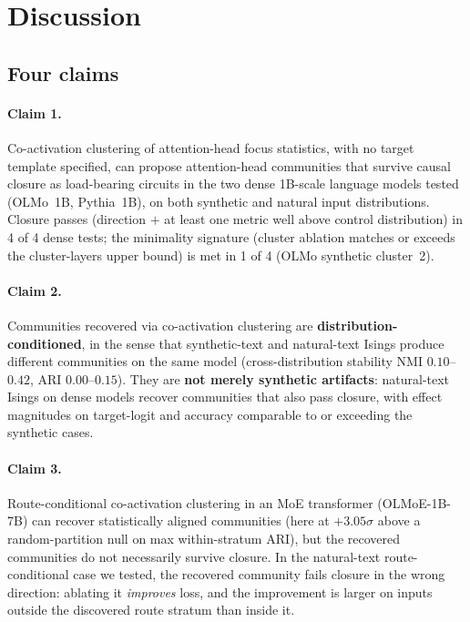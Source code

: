 \documentclass[11pt]{article}
\begin{document}
\section{Discussion}
\label{sec:discussion}

\subsection{Four claims}

\paragraph{Claim 1.} Co-activation clustering of attention-head focus
statistics, with no target template specified, can propose attention-head
communities that survive causal closure as load-bearing circuits in the
two dense 1B-scale language models tested (OLMo~1B, Pythia~1B), on both
synthetic and natural input distributions. Closure passes (direction
$+$ at least one metric well above control distribution) in 4 of 4 dense
tests; the minimality signature (cluster ablation matches or exceeds the
cluster-layers upper bound) is met in 1 of 4 (OLMo synthetic cluster~2).

\paragraph{Claim 2.} Communities recovered via co-activation clustering
are \textbf{distribution-conditioned}, in the sense that synthetic-text
and natural-text Isings produce different communities on the same model
(cross-distribution stability NMI $0.10$--$0.42$, ARI $0.00$--$0.15$).
They are \textbf{not merely synthetic artifacts}: natural-text Isings on
dense models recover communities that also pass closure, with effect
magnitudes on target-logit and accuracy comparable to or exceeding the
synthetic cases.

\paragraph{Claim 3.} Route-conditional co-activation clustering in an MoE
transformer (OLMoE-1B-7B) can recover statistically aligned communities
(here at $+3.05\sigma$ above a random-partition null on max within-stratum
ARI), but the recovered communities do not necessarily survive closure.
In the natural-text route-conditional case we tested, the recovered
community fails closure in the wrong direction: ablating it
\emph{improves} loss, and the improvement is larger on inputs outside the
discovered route stratum than inside it.
\end{document}
